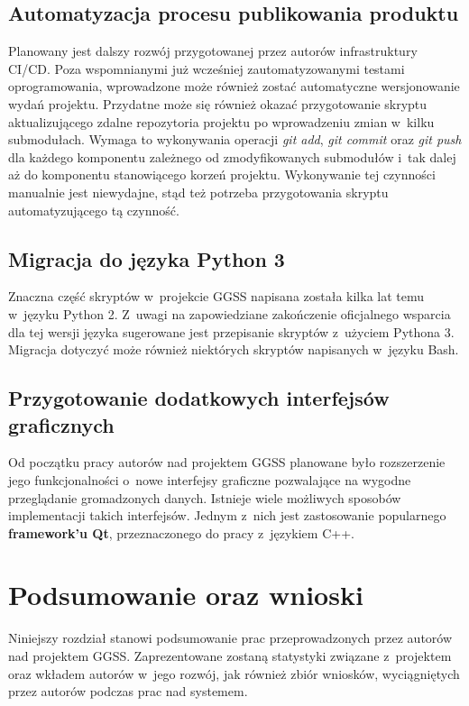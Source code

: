 \section{Automatyzacja procesu publikowania produktu}
Planowany jest dalszy rozwój przygotowanej przez autorów infrastruktury CI/CD. Poza wspomnianymi już wcześniej zautomatyzowanymi testami oprogramowania, wprowadzone może również zostać automatyczne wersjonowanie wydań projektu. Przydatne może się również okazać przygotowanie skryptu aktualizującego zdalne repozytoria projektu po wprowadzeniu zmian w~kilku submodułach. Wymaga to wykonywania operacji \textit{git add}, \textit{git commit} oraz \textit{git push} dla każdego komponentu zależnego od zmodyfikowanych submodułów i~tak dalej aż do komponentu stanowiącego korzeń projektu. Wykonywanie tej czynności manualnie jest niewydajne, stąd też potrzeba przygotowania skryptu automatyzującego tą czynność.


\section{Migracja do języka Python 3}
Znaczna część skryptów w~projekcie GGSS napisana została kilka lat temu w~języku Python 2. Z~uwagi na zapowiedziane zakończenie oficjalnego wsparcia dla tej wersji języka sugerowane jest przepisanie skryptów z~użyciem Pythona 3. Migracja dotyczyć może również niektórych skryptów napisanych w~języku Bash. 

\section{Przygotowanie dodatkowych interfejsów graficznych}
Od początku pracy autorów nad projektem GGSS planowane było rozszerzenie jego funkcjonalności o~nowe interfejsy graficzne pozwalające na wygodne przeglądanie gromadzonych danych. Istnieje wiele możliwych sposobów implementacji takich interfejsów. Jednym z~nich jest zastosowanie popularnego \textbf{framework'u Qt}, przeznaczonego do pracy z~językiem C++. 


\chapter{Podsumowanie oraz wnioski}
\label{cha:summary}
Niniejszy rozdział stanowi podsumowanie prac przeprowadzonych przez autorów nad projektem GGSS. Zaprezentowane zostaną statystyki związane z~projektem oraz wkładem autorów w~jego rozwój, jak również zbiór wniosków, wyciągniętych przez autorów podczas prac nad systemem. 


